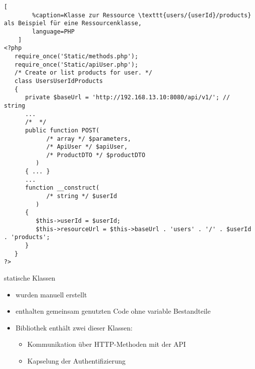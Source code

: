 \begin{frame}
    \begin{lstlisting}[
        %caption=Klasse zur Ressource \texttt{users/{userId}/products} als Beispiel für eine Ressourcenklasse,
        language=PHP
    ]
<?php
   require_once('Static/methods.php');
   require_once('Static/apiUser.php');
   /* Create or list products for user. */
   class UsersUserIdProducts
   {
      private $baseUrl = 'http://192.168.13.10:8080/api/v1/'; // string
      ...
      /*  */
      public function POST(
            /* array */ $parameters, 
            /* ApiUser */ $apiUser,
            /* ProductDTO */ $productDTO
         )
      { ... }
      ...
      function __construct(
            /* string */ $userId
         )
      {
         $this->userId = $userId;
         $this->resourceUrl = $this->baseUrl . 'users' . '/' . $userId . 'products';
      }
   }
?>
    \end{lstlisting}
\end{frame}

\begin{frame}{statische Klassen}
    \begin{itemize}
        \item wurden manuell erstellt
        \item enthalten gemeinsam genutzten Code ohne variable Bestandteile
        \item Bibliothek enthält zwei dieser Klassen:
        \begin{itemize}
            \item Kommunikation über HTTP-Methoden mit der API
            \item Kapselung der Authentifizierung
        \end{itemize}
    \end{itemize}
\end{frame}